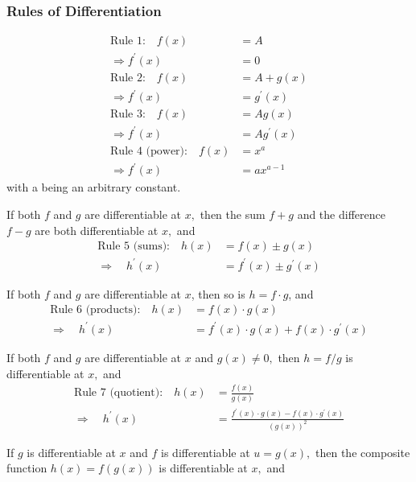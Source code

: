 
\pbn
\subsubsection*{Rules of Differentiation}

\begin{align*}
	\text{Rule 1:}\quad	f(x)&=A \\
	\Rightarrow  f^{\prime}(x)&=0\\
	\text{Rule 2:}\quad	f(x)&=A+g(x)  \\
	\Rightarrow  f^{\prime}(x)&=g^{\prime}(x)\\
	\text{Rule 3:}\quad	f(x)&=Ag(x)  \\
	\Rightarrow  f^{\prime}(x)&=A g^{\prime}(x)\\
	\text{Rule 4 (power):}\quad	f(x)&=x^{a} \\
	\Rightarrow  f^{\prime}(x)&=a x^{a-1}
\end{align*}
with a being an arbitrary constant.

If both $f$ and $g$ are differentiable at $x,$ then the sum $f+g$ and the difference $f-g$ are both differentiable at $x,$ and
\begin{align*}
	\text{Rule 5 (sums):}\quad	h(x)&=f(x) \pm g(x)\\
	\Rightarrow \quad h^{\prime}(x)&=f^{\prime}(x) \pm g^{\prime}(x)
\end{align*}

\pbn
If both $f$ and $g$ are differentiable at $x$, then so is $h=f \cdot g$,  and 
\begin{align*}
	\text{Rule 6 (products):}\quad h(x)&=f(x) \cdot g(x) \\
	\Rightarrow \quad h^{\prime}(x)&=f^{\prime}(x) \cdot g(x)+f(x) \cdot g^{\prime}(x)
\end{align*}



\pbn
If both $f$ and $g$ are differentiable at $x$ and $g(x) \neq 0,$ then $h=f / g$ is differentiable at $x,$ and 
\begin{align*}
	\text{Rule 7 (quotient):}\quad	h(x)&=\frac{f(x)}{g(x)} \\
	\Rightarrow \quad h^{\prime}(x)&=\frac{f^{\prime}(x) \cdot g(x)-f(x) \cdot g^{\prime}(x)}{(g(x))^{2}}
\end{align*}



\pbn
If $g$ is differentiable at $x$ and $f$ is differentiable at $u=g(x),$ then the composite function $h(x)=f(g(x))$ is differentiable at $x,$ and

